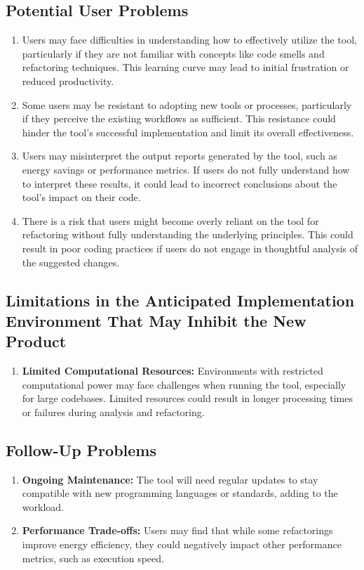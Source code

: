 \documentclass[12pt]{article}
\begin{document}
\subsection{Potential User Problems}
\begin{enumerate}
  \item Users may face difficulties in understanding how to
    effectively utilize the tool, particularly if they are not
    familiar with concepts like code smells and refactoring
    techniques. This learning curve may lead to initial frustration
    or reduced productivity.
  \item Some users may be resistant to adopting new tools or
    processes, particularly if they perceive the existing workflows
    as sufficient. This resistance could hinder the tool's successful
    implementation and limit its overall effectiveness.
  \item Users may misinterpret the output reports generated by the
    tool, such as energy savings or performance metrics. If users do
    not fully understand how to interpret these results, it could
    lead to incorrect conclusions about the tool's impact on their code.
  \item There is a risk that users might become overly reliant on the
    tool for refactoring without fully understanding the underlying
    principles. This could result in poor coding practices if users
    do not engage in thoughtful analysis of the suggested changes.
\end{enumerate}
\subsection{Limitations in the Anticipated Implementation Environment That May
Inhibit the New Product}
\begin{enumerate}
  \item \textbf{Limited Computational Resources:} Environments with
    restricted computational power may face challenges when running
    the tool, especially for large codebases. Limited resources could
    result in longer processing times or failures during analysis and
    refactoring.
\end{enumerate}
\subsection{Follow-Up Problems}
\begin{enumerate}
  \item \textbf{Ongoing Maintenance:} The tool will need regular
    updates to stay compatible with new programming languages or
    standards, adding to the workload.
  \item \textbf{Performance Trade-offs:} Users may find that while
    some refactorings improve energy efficiency, they could
    negatively impact other performance metrics, such as execution speed.
\end{enumerate}
\end{document}
